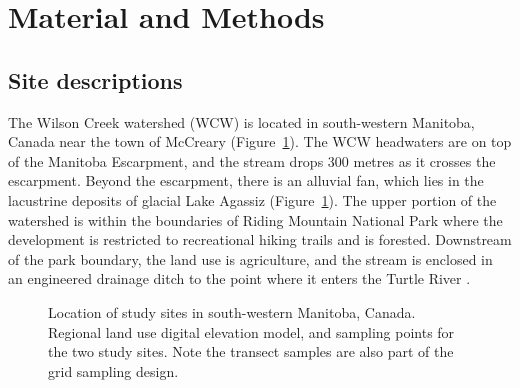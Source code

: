 \documentclass[
  number]{elsarticle}
\begin{document}
\section{Material and Methods}\label{material-and-methods}

\subsection{Site descriptions}\label{site-descriptions}

The Wilson Creek watershed (WCW) is located in south-western Manitoba,
Canada near the town of McCreary (Figure~\ref{fig-map}). The WCW
headwaters are on top of the Manitoba Escarpment, and the stream drops
300 metres as it crosses the escarpment. Beyond the escarpment, there is
an alluvial fan, which lies in the lacustrine deposits of glacial Lake
Agassiz \citep{mcginn1979} (Figure~\ref{fig-map}). The upper portion of
the watershed is within the boundaries of Riding Mountain National Park
where the development is restricted to recreational hiking trails and is
forested. Downstream of the park boundary, the land use is agriculture,
and the stream is enclosed in an engineered drainage ditch to the point
where it enters the Turtle River \citep{mackay1970, mcginn1979}.

\begin{figure}


\caption{\label{fig-map}Location of study sites in south-western
Manitoba, Canada. Regional land use digital elevation model, and
sampling points for the two study sites. Note the transect samples are
also part of the grid sampling design.}

\end{figure}%
\end{document}
